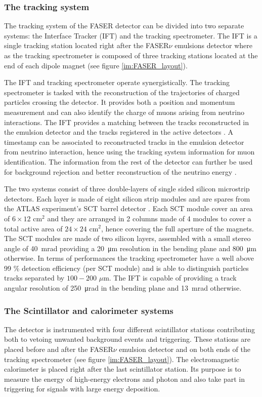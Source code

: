 			\subsubsection{The tracking system}
			The tracking system of the FASER detector can be divided into two separate systems: the Interface Tracker (IFT) and the tracking spectrometer. The IFT is a single tracking station located right after the FASER$\nu$ emulsions detector where as the tracking spectrometer is composed of three tracking stations located at the end of each dipole magnet (see figure \ref{im:FASER_layout}). 
			
			The IFT and tracking spectrometer operate synergistically. The tracking spectrometer is tasked with the reconstruction of the trajectories of charged particles crossing the detector. It provides both a position and momentum measurement and can also identify the charge of muons arising from neutrino interactions. The IFT provides a matching between the tracks reconstructed in the emulsion detector and the tracks registered in the active detectors \cite{FASER_Detector}. A timestamp can be associated to reconstructed tracks in the emulsion detector from neutrino interaction, hence using the tracking system information for muon identification. The information from the rest of the detector can further be used for background rejection and better reconstruction of the neutrino energy \cite{FASER_Detector}. 
			
			The two systems consist of three double-layers of single sided silicon microstrip detectors. Each layer is made of eight silicon strip modules and are spares from the ATLAS experiment's SCT barrel detector \cite{SCT_ATLAS}. Each SCT module cover an area of $6 \times 12$ cm$^2$ and they are arranged in 2 columns made of 4 modules to cover a total active area of $24 \times 24$  cm$^2$, hence covering the full aperture of the magnets. The SCT modules are made of two silicon layers, assembled with a small stereo angle of \SI{40}{\milli\radian} providing a \SI{20}{\micro\meter} resolution in the bending plane and \SI{800}{\micro\meter} otherwise. In terms of performances the tracking spectrometer have a well above 99 $\%$ detection efficiency (per SCT module) and is able to distinguish particles tracks separated by $100-200$ $\mu$m. The IFT is capable of providing a track angular resolution  of \SI{250}{\micro\radian} in the bending plane and \SI{13}{\milli\radian} otherwise.  
			  
			 \subsubsection{The Scintillator and calorimeter systems}
			 The detector is instrumented with four different scintillator stations contributing both to vetoing unwanted background events and triggering. These stations are placed before and after the FASER$\nu$ emulsion detector and on both ends of the tracking spectrometer (see figure \ref{im:FASER_layout}). The electromagnetic calorimeter is placed right after the last scintillator station. Its purpose is to measure the energy of high-energy electrons and photon and also take part in triggering for signals with large energy deposition. 
			 
